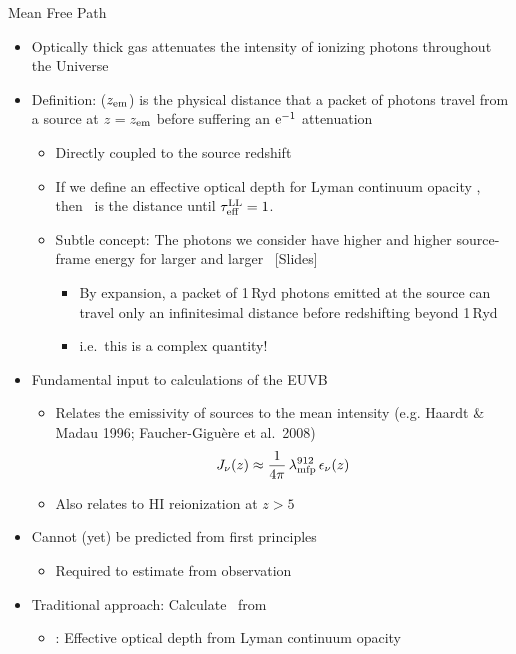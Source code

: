 \documentclass[12pt,letterpaper]{article}
\begin{document}
\begin{Aenumerate}
{\bf \item Mean Free Path \lmfp}
  \begin{itemize}
  \item Optically thick gas attenuates the intensity of ionizing
  photons throughout the Universe
  \item Definition: \lmfp($z_{\rm em}$) is the physical distance that
  a packet of photons travel from a source at $z=z_{\rm em}$
  before suffering an $\rm e^{-1}$ attenuation
  	\begin{itemize}
  	\item Directly coupled to the source redshift
  	\item If we define an effective optical depth for Lyman
  	continuum opacity \tll, then \lmfp\ is the distance until 
  	$\tau_{\rm eff}^{\rm LL} = 1$.
  	\item Subtle concept: The photons we consider have higher
  	and higher source-frame energy for larger and larger \lmfp\ 
  	[Slides]
  		\begin{itemize}
  		\item By expansion, a packet of 1\,Ryd photons emitted
  		at the source can travel only an infinitesimal distance before
  		redshifting beyond 1\,Ryd
  		\item i.e.\ this is a complex quantity! 
  		\end{itemize}
  	\end{itemize}
  \item Fundamental input to calculations of the EUVB
  	\begin{itemize}
  	\item Relates the emissivity of sources to the mean intensity
  	(e.g. Haardt \& Madau 1996; Faucher-Gigu\`ere et al.\ 2008)
  	\begin{equation}
  	J_\nu(z) \approx \frac{1}{4 \pi} \, \lambda_{\rm mfp}^{912} \, \epsilon_\nu(z)
  	\end{equation}
  	\item Also relates to HI reionization at $z>5$
  	\end{itemize}
  \item Cannot (yet) be predicted from first principles
    \begin{itemize}
    \item Required to estimate from observation
  \end{itemize}
  \item Traditional approach: Calculate \tll\ from \fnhi
  	\begin{itemize}
  	\item \tll: Effective optical depth from Lyman continuum opacity

\end{itemize}
\end{itemize}
\end{Aenumerate}
\end{document}
